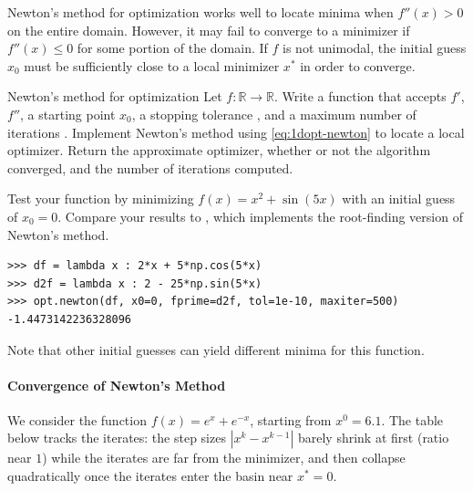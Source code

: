 Newton's method for optimization works well to locate minima when $f''(x) > 0$ on the entire domain.
However, it may fail to converge to a minimizer if $f''(x) \le 0$ for some portion of the domain.
If $f$ is not unimodal, the initial guess $x_0$ must be sufficiently close to a local minimizer $x^*$ in order to converge.

\begin{problem}{Newton's method for optimization}{}
Let $f:\mathbb{R}\rightarrow\mathbb{R}$.
Write a function that accepts $f'$, $f''$, a starting point $x_0$, a stopping tolerance , and a maximum number of iterations .
Implement Newton's method using \eqref{eq:1dopt-newton} to locate a local optimizer.
Return the approximate optimizer, whether or not the algorithm converged, and the number of iterations computed.

Test your function by minimizing $f(x) = x^2 + \sin(5x)$ with an initial guess of $x_0 = 0$.
Compare your results to , which implements the root-finding version of Newton's method.
\begin{lstlisting}
>>> df = lambda x : 2*x + 5*np.cos(5*x)
>>> d2f = lambda x : 2 - 25*np.sin(5*x)
>>> opt.newton(df, x0=0, fprime=d2f, tol=1e-10, maxiter=500)
-1.4473142236328096
\end{lstlisting}
Note that other initial guesses can yield different minima for this function.
\end{problem}


\paragraph{Convergence of Newton's Method}

We consider the function $f(x) = e^x + e^{-x}$, starting from $x^0 = 6.1$. The table below tracks the iterates: the step sizes $|x^k - x^{k-1}|$ barely shrink at first (ratio near $1$) while the iterates are far from the minimizer, and then collapse quadratically once the iterates enter the basin near $x^* = 0$.

